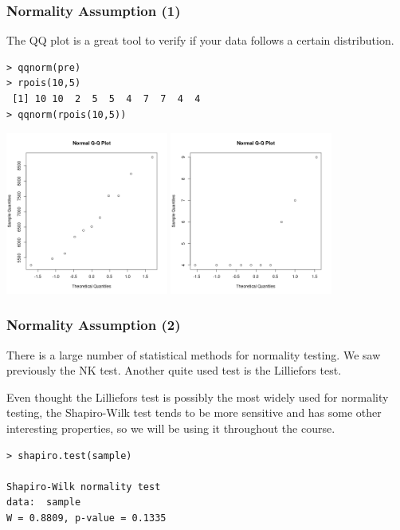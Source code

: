 \documentclass[10pt]{beamer}
\begin{document}
\begin{frame}
  \frametitle{Normality Assumption (1)}
  \begin{block}{}
    The QQ plot is a great tool to verify if your data follows a certain distribution.
\begin{verbatim}
> qqnorm(pre)
> rpois(10,5)
 [1] 10 10  2  5  5  4  7  7  4  4
> qqnorm(rpois(10,5))
\end{verbatim}
  \end{block}
  \begin{center}
    \includegraphics[width=0.4\textwidth]{img/qqplot_intake}
    \hfill
    \includegraphics[width=0.4\textwidth]{img/qqplot_poisson}
  \end{center}
\end{frame}

\begin{frame}
  \frametitle{Normality Assumption (2)}

  There is a large number of statistical methods for normality
  testing. We saw previously the NK test. Another quite used test is
  the Lilliefors test.

  Even thought the Lilliefors test is possibly the most widely used
  for normality testing, the Shapiro-Wilk test tends to be more
  sensitive and has some other interesting properties, so we will be
  using it throughout the course. 
\begin{verbatim}
> shapiro.test(sample)
    
Shapiro-Wilk normality test
data:  sample
W = 0.8809, p-value = 0.1335
\end{verbatim}
\end{frame}
\end{document}

